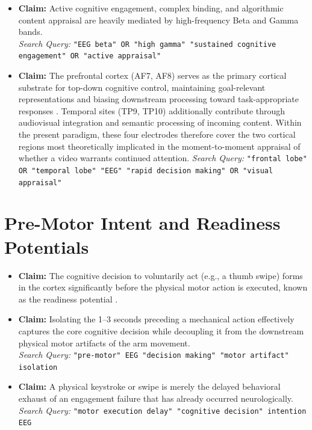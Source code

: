\documentclass[12pt,a4paper]{report}
\begin{document}
\begin{itemize}
    \item \textbf{Claim:} Active cognitive engagement, complex binding, and algorithmic content appraisal are heavily mediated by high-frequency Beta and Gamma bands.\\
    \textit{Search Query:} \texttt{"EEG beta" OR "high gamma" "sustained cognitive engagement" OR "active appraisal"}
    
    \item \textbf{Claim:} The prefrontal cortex (AF7, AF8) serves as the primary cortical substrate for top-down cognitive control, maintaining goal-relevant representations and biasing downstream processing toward task-appropriate responses \cite{miller_integrative_2001}. Temporal sites (TP9, TP10) additionally contribute through audiovisual integration and semantic processing of incoming content. Within the present paradigm, these four electrodes therefore cover the two cortical regions most theoretically implicated in the moment-to-moment appraisal of whether a video warrants continued attention.
    \textit{Search Query:} \texttt{"frontal lobe" OR "temporal lobe" "EEG" "rapid decision making" OR "visual appraisal"}
\end{itemize}

\section{Pre-Motor Intent and Readiness Potentials}
\begin{itemize}
    \item \textbf{Claim:} The cognitive decision to voluntarily act (e.g., a thumb swipe) forms in the cortex significantly before the physical motor action is executed, known as the readiness potential \cite{libet_time_1983, shakeel_review_2015}.
    
    \item \textbf{Claim:} Isolating the 1--3 seconds preceding a mechanical action effectively captures the core cognitive decision while decoupling it from the downstream physical motor artifacts of the arm movement.\\
    \textit{Search Query:} \texttt{"pre-motor" EEG "decision making" "motor artifact" isolation}
    
    \item \textbf{Claim:} A physical keystroke or swipe is merely the delayed behavioral exhaust of an engagement failure that has already occurred neurologically.\\
    \textit{Search Query:} \texttt{"motor execution delay" "cognitive decision" intention EEG}
\end{itemize}
\end{document}
